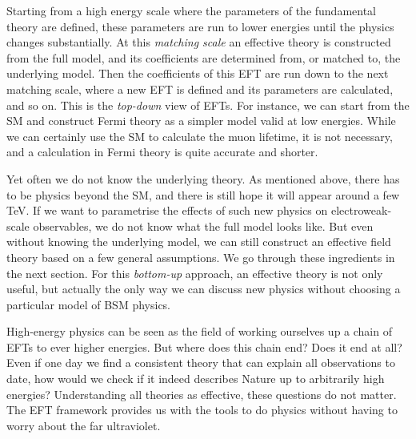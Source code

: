 Starting from a high energy scale where the parameters of the
fundamental theory are defined, these parameters are run to lower
energies until the physics changes substantially. At this
\emph{matching scale} an effective theory is constructed from the full
model, and its coefficients are determined from, or matched to, the
underlying model. Then the coefficients of this EFT are run down to
the next matching scale, where a new EFT is defined and its parameters
are calculated, and so on. This is the \emph{top-down} view of
EFTs. For instance, we can start from the SM and construct Fermi
theory as a simpler model valid at low energies. While we can
certainly use the SM to calculate the muon lifetime, it is not
necessary, and a calculation in Fermi theory is quite accurate and
shorter.

Yet often we do not know the underlying theory. As mentioned above,
there has to be physics beyond the SM, and there is still hope it will
appear around a few TeV. If we want to parametrise the effects of such
new physics on electroweak-scale observables, we do not know what the
full model looks like. But even without knowing the underlying model,
we can still construct an effective field theory based on a few
general assumptions. We go through these ingredients in the next
section. For this \emph{bottom-up} approach, an effective theory is
not only useful, but actually the only way we can discuss new physics
without choosing a particular model of BSM physics.

High-energy physics can be seen as the field of working ourselves up a
chain of EFTs to ever higher energies. But where does this chain end?
Does it end at all? Even if one day we find a consistent theory that
can explain all observations to date, how would we check if it indeed
describes Nature up to arbitrarily high energies? Understanding all
theories as effective, these questions do not matter. The EFT
framework provides us with the tools to do physics without having to
worry about the far ultraviolet.


